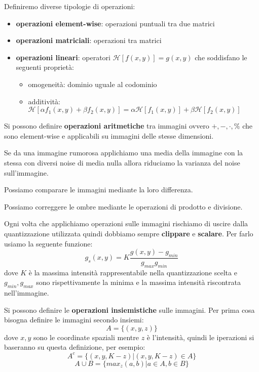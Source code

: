 Definiremo diverse tipologie di operazioni:
\begin{itemize}
    \item \textbf{operazioni element-wise}: operazioni puntuali tra due matrici
    \item \textbf{operazioni matriciali}: operazioni tra matrici
    \item \textbf{operazioni lineari}: operatori $\mathcal{H}[f(x,y)] = g(x,y)$ che soddisfano le seguenti proprietà:
    \begin{itemize}
        \item omogeneità: dominio uguale al codominio
        \item additività: $\mathcal{H}[\alpha f_1(x,y) + \beta f_2(x,y)] =\alpha  \mathcal{H}[f_1(x,y)] + \beta  \mathcal{H}[f_2(x,y)] $
    \end{itemize}
\end{itemize}

Si possono definire \textbf{operazioni aritmetiche} tra immagini ovvero $+, -, \cdot, \%$
che sono element-wise e applicabili su immagini delle stesse dimensioni. 

\begin{nota}
    Se da una immagine rumorosa applichiamo una media della immagine con la stessa con 
    diversi noise di media nulla allora riduciamo la varianza del noise sull'immagine.    
\end{nota}

\begin{nota}
    Possiamo comparare le immagini mediante la loro differenza.
\end{nota}

\begin{nota}
    Possiamo correggere le ombre mediante le operazioni di prodotto e divisione.
\end{nota}

Ogni volta che applichiamo operazioni sulle immagini rischiamo di uscire dalla 
quantizzazione utilizzata quindi dobbiamo sempre \textbf{clippare} e \textbf{scalare}.
Per farlo usiamo la seguente funzione:
$$g_s(x,y) = K\frac{g(x,y) -g_{min}}{g_{max} g_{min}}$$
dove $K$ è la massima intensità rappresentabile nella quantizzazione scelta e 
$g_{min}, g_{max}$ sono rispettivamente la minima e la massima intensità riscontrata 
nell'immagine.

Si possono definire le \textbf{operazioni insiemistiche} sulle immagini. Per prima cosa 
bisogna definire le immagini secondo insiemi:
$$A = \{ (x,y,z) \}$$
dove $x,y$ sono le coordinate spaziali mentre $z$ è l'intensità, quindi le iperazioni 
si baseranno su questa definizione, per esempio:
$$A^c=\{(x,y, K-z) |(x,y, K-z) \in A\}$$
$$A\cup B=\{max_z(a,b) |a \in A, b\in B\}$$

